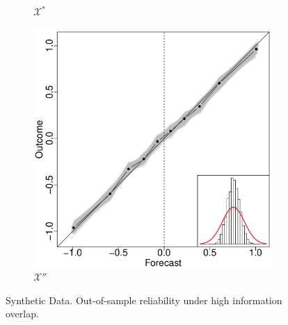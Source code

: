 \documentclass[12pt]{article}
\theoremstyle{definition}
\theoremstyle{definition}
\begin{document}
\begin{figure}[t!]
\begin{subfigure}[b]{0.240\textwidth}
                \caption{$\mathcal{X}^*$ }
        \label{ELOPHighOverlap}
        \end{subfigure}
           \begin{subfigure}[b]{0.240\textwidth}
                \includegraphics[width=\textwidth]{SimDepOPT.pdf}
                \caption{$\mathcal{X}''$ }
        \label{RevHighOverlap}
        \end{subfigure}
          \caption{Synthetic Data. Out-of-sample reliability under high information overlap. }
   \label{HighOverlap}
\end{figure}
\end{document}

